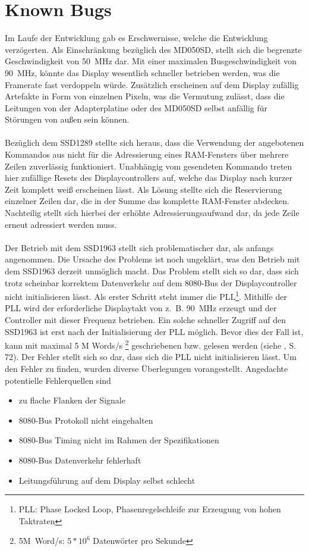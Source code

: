 \section{Known Bugs}
Im Laufe der Entwicklung gab es Erschwernisse, welche die Entwicklung verzögerten. 
Als Einschränkung bezüglich des MD050SD, stellt sich die begrenzte Geschwindigkeit von 50~MHz dar. Mit einer maximalen Busgeschwindigkeit von 90~MHz, könnte das Display wesentlich schneller betrieben werden, was die Framerate fast verdoppeln würde. Zusätzlich erscheinen auf dem Display zufällig Artefakte in Form von einzelnen Pixeln, was die Vermutung zulässt, dass die Leitungen von der Adapterplatine oder des MD050SD selbst anfällig für Störungen von außen sein können. \\ \\
Bezüglich dem SSD1289 stellte sich heraus, dass die Verwendung der angebotenen Kommandos aus  nicht für die Adressierung eines RAM-Fensters über mehrere Zeilen zuverlässig funktioniert. Unabhängig vom gesendeten Kommando treten hier zufällige Resets des Displaycontrollers auf, welche das Display nach kurzer Zeit komplett weiß erscheinen lässt. Als Lösung stellte sich die Reservierung einzelner Zeilen dar, die in der Summe das komplette RAM-Fenster abdecken. Nachteilig stellt sich hierbei der erhöhte Adressierungsaufwand dar, da jede Zeile erneut adressiert werden muss.\\ \\
Der Betrieb mit dem SSD1963 stellt sich problematischer dar, als anfangs angenommen. Die Ursache des Problems ist noch ungeklärt, was den Betrieb mit dem SSD1963 derzeit unmöglich macht.
Das Problem stellt sich so dar, dass sich trotz scheinbar korrektem Datenverkehr auf dem 8080-Bus der Displaycontroller nicht initialisieren lässt. Als erster Schritt steht immer die PLL\footnote{PLL: Phase Locked Loop, Phasenregelschleife zur Erzeugung von hohen Taktraten}. Mithilfe der PLL wird der erforderliche Displaytakt von z.~B. 90~MHz erzeugt und der Controller mit dieser Frequenz betrieben. Ein solche schneller Zugriff auf den SSD1963 ist erst nach der Initialisierung der PLL möglich. Bevor dies der Fall ist, kann mit maximal 5 M Words/s \footnote{5M~Word/s: $5*10^6$ Datenwörter pro Sekunde} geschriebenen bzw. gelesen werden (siehe \cite{SSD2008}, S. 72). Der Fehler stellt sich so dar, dass sich die PLL nicht initialisieren lässt. Um den Fehler zu finden, wurden diverse Überlegungen vorangestellt. Angedachte potentielle Fehlerquellen sind
\begin{itemize}
\item zu flache Flanken der Signale
\item 8080-Bus Protokoll nicht eingehalten
\item 8080-Bus Timing nicht im Rahmen der Spezifikationen
\item 8080-Bus Datenverkehr fehlerhaft
\item Leitungsführung auf dem Display selbst schlecht
\end{itemize}

